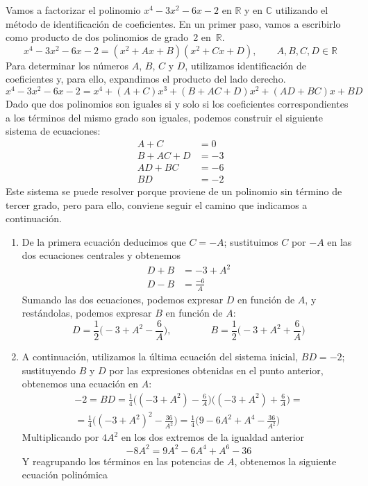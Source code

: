 \begin{ejemplo}
Vamos a factorizar el polinomio $x^4-3x^2-6x-2$ en $\mathbb{R}$ y en $\mathbb{C}$ utilizando el método de identificación de coeficientes.
En un primer paso, vamos a escribirlo como producto de dos polinomios de grado~2 en~$\mathbb{R}$.
\[
x^4-3x^2-6x-2=(x^2+Ax+B)(x^2+Cx+\mathit{D}),\qquad
A,B,C,D\in\mathbb{R}
\]
Para determinar los números $A$, $B$, $C$ y $\mathit D$, utilizamos identificación de coeficientes y, para ello, expandimos el producto del lado derecho.
\[
x^4-3x^2-6x-2=
x^4+(A+C)x^3+(B+AC+\mathit{D})x^2+(A\mathit{D}+BC)x+B\mathit{D}
\]
Dado que dos polinomios son iguales si y solo si los coeficientes correspondientes a los términos del mismo grado son iguales, podemos construir el siguiente sistema de ecuaciones:
\begin{align*}
A+C&=0\\
B+AC+\mathit{D}&=-3\\
A\mathit{D}+BC& =-6\\
B\mathit{D}&=-2
\end{align*}
Este sistema se puede resolver porque proviene de un polinomio sin término de tercer grado,
pero para ello, conviene seguir el camino que indicamos a continuación.
\begin{enumerate}
\item
De la primera ecuación deducimos que $C=-A$; sustituimos $C$ por $-A$ en las dos ecuaciones centrales y obtenemos
\begin{align*}
\mathit{D}+B &=-3+A^2\\
\mathit{D}-B &=\frac{-6}A
\end{align*}
Sumando las dos ecuaciones, podemos expresar $D$ en función de $A$, y restándolas, podemos expresar $B$ en función de $A$:
\[
\mathit{D}=\frac12\Big(-3+A^2-\frac6A\Big),\qquad\qquad B=\frac12\Big(-3+A^2+\frac6A\Big)
\]
\item
A continuación, utilizamos la última ecuación del sistema inicial, $B\mathit{D}=-2$; sustituyendo $B$ y $\mathit{D}$ por las expresiones obtenidas en el punto anterior, obtenemos una ecuación en $A$:
\begin{multline*}
-2=B\mathit{D}= \frac14\Big((-3+A^2)-\frac6A\Big)\Big((-3+A^2)+\frac6A\Big)=\\
=\frac14\Big((-3+A^2)^2-\frac{36}{A^2}\Big) =
\frac14\Big(9-6A^2+A^4-\frac{36}{A^2}\Big)
\end{multline*}
Multiplicando por $4A^2$ en los dos extremos de la igualdad anterior
\[
-8A^2=9A^2-6A^4+A^6-36
\]
Y reagrupando los términos en las potencias de $A$, obtenemos la siguiente ecuación polinómica

\end{enumerate}
\end{ejemplo}
